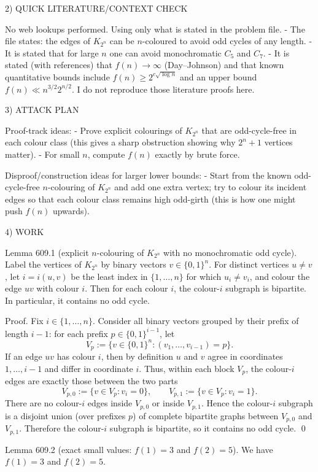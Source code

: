 2) QUICK LITERATURE/CONTEXT CHECK

No web lookups performed. Using only what is stated in the problem file.
- The file states: the edges of $K_{2^n}$ can be $n$-coloured to avoid odd cycles of any length.
- It is stated that for large $n$ one can avoid monochromatic $C_5$ and $C_7$.
- It is stated (with references) that $f(n)\to\infty$ (Day--Johnson) and that known quantitative bounds include
  $f(n)\ge 2^{c\sqrt{\log n}}$ and an upper bound $f(n)\ll n^{3/2}2^{n/2}$.
I do not reproduce those literature proofs here.

3) ATTACK PLAN

Proof-track ideas:
- Prove explicit colourings of $K_{2^n}$ that are odd-cycle-free in each colour class (this gives a sharp obstruction showing why $2^n+1$ vertices matter).
- For small $n$, compute $f(n)$ exactly by brute force.

Disproof/construction ideas for larger lower bounds:
- Start from the known odd-cycle-free $n$-colouring of $K_{2^n}$ and add one extra vertex; try to colour its incident edges so that each colour class remains high odd-girth (this is how one might push $f(n)$ upwards).

4) WORK

Lemma 609.1 (explicit $n$-colouring of $K_{2^n}$ with no monochromatic odd cycle).
Label the vertices of $K_{2^n}$ by binary vectors $v\in\{0,1\}^n$.
For distinct vertices $u\neq v$, let $i=i(u,v)$ be the least index in $\{1,\dots,n\}$ for which $u_i\neq v_i$, and colour the edge $uv$ with colour $i$.
Then for each colour $i$, the colour-$i$ subgraph is bipartite. In particular, it contains no odd cycle.

Proof.
Fix $i\in\{1,\dots,n\}$.
Consider all binary vectors grouped by their prefix of length $i-1$:
for each prefix $p\in\{0,1\}^{i-1}$, let
\[
V_p := \{ v\in\{0,1\}^n : (v_1,\dots,v_{i-1})=p\}.
\]
If an edge $uv$ has colour $i$, then by definition $u$ and $v$ agree in coordinates $1,\dots,i-1$ and differ in coordinate $i$.
Thus, within each block $V_p$, the colour-$i$ edges are exactly those between the two parts
\[
V_{p,0}:=\{v\in V_p: v_i=0\},\qquad V_{p,1}:=\{v\in V_p: v_i=1\}.
\]
There are no colour-$i$ edges inside $V_{p,0}$ or inside $V_{p,1}$.
Hence the colour-$i$ subgraph is a disjoint union (over prefixes $p$) of complete bipartite graphs between $V_{p,0}$ and $V_{p,1}$.
Therefore the colour-$i$ subgraph is bipartite, so it contains no odd cycle.
\qed

Lemma 609.2 (exact small values: $f(1)=3$ and $f(2)=5$).
We have $f(1)=3$ and $f(2)=5$.

